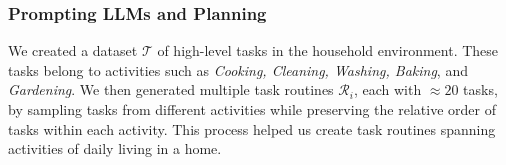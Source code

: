 \subsubsection{Prompting LLMs and Planning}
\label{sec:llm-prompting}
We created a dataset $\mathcal{T}$ of high-level tasks in the household environment. These tasks belong to activities such as \textit{Cooking, Cleaning, Washing, Baking}, and \textit{Gardening}. We then generated multiple task routines $\mathcal{R}_i$, each with $\approx 20$ tasks, by sampling tasks from different activities while preserving the relative order of tasks within each activity. %
This process helped us create task routines spanning activities of daily living in a home. 


